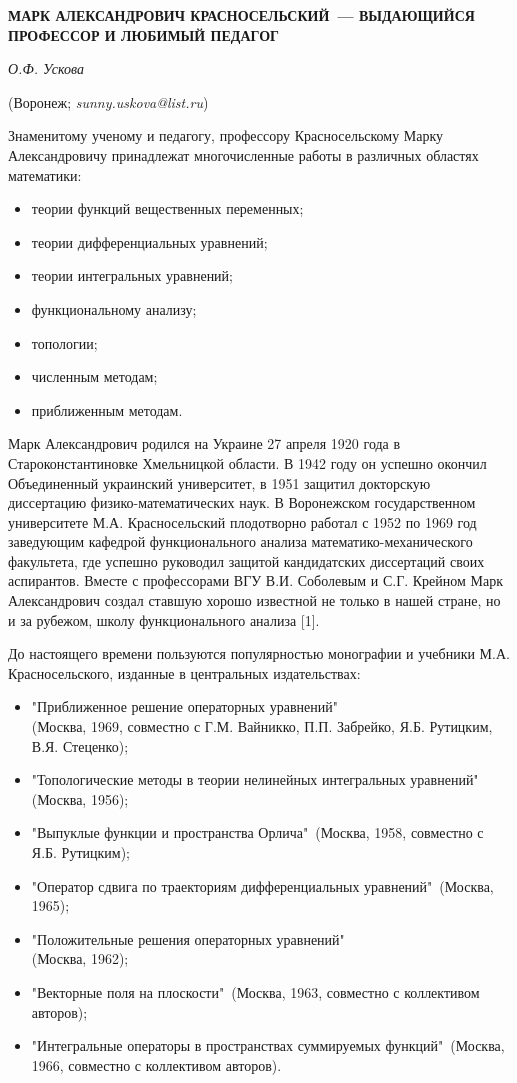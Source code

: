 \begin{center}
    {\bf МАРК АЛЕКСАНДРОВИЧ КРАСНОСЕЛЬСКИЙ~--- ВЫДАЮЩИЙСЯ ПРОФЕССОР И ЛЮБИМЫЙ ПЕДАГОГ}

    {\it О.Ф. Ускова}

    (Воронеж; {\it sunny.uskova@list.ru})
\end{center}


Знаменитому ученому и педагогу, профессору Красносельскому Марку Александровичу принадлежат многочисленные работы в различных
областях математики:
\begin{itemize}
\item теории функций вещественных переменных;
\item теории дифференциальных уравнений;
\item теории интегральных уравнений;
\item функциональному анализу;
\item топологии;
\item численным методам;
\item приближенным методам.
\end{itemize}

Марк Александрович родился на Украине 27 апреля 1920 года в Староконстантиновке Хмельницкой области. В 1942 году он успешно окончил
Объединенный украинский университет, в 1951 защитил докторскую диссертацию физико-математических наук. В Воронежском государственном
университете М.А. Красносельский плодотворно работал с 1952 по 1969 год заведующим кафедрой функционального анализа
математико-механического факультета, где успешно руководил защитой кандидатских диссертаций своих аспирантов. Вместе с профессорами
ВГУ В.И. Соболевым и С.Г. Крейном Марк Александрович создал ставшую хорошо известной не только в нашей стране, но и за рубежом,
школу функционального анализа [1].

До настоящего времени пользуются популярностью монографии и учебники М.А. Красносельского, изданные в центральных издательствах:
\begin{itemize}
\item "Приближенное решение операторных уравнений"\\ (Москва, 1969, совместно с Г.М. Вайникко, П.П. Забрейко, Я.Б. Рутицким,
В.Я. Стеценко);
\item "Топологические методы в теории нелинейных интегральных уравнений"\, (Москва, 1956);
\item "Выпуклые функции и пространства Орлича"\, (Москва, 1958, совместно с Я.Б. Рутицким);
\item "Оператор сдвига по траекториям дифференциальных уравнений"\, (Москва, 1965);
\item "Положительные решения операторных уравнений"\\(Москва, 1962);
\item "Векторные поля на плоскости"\, (Москва, 1963, совместно с коллективом авторов);
\item "Интегральные операторы в пространствах суммируемых функций"\, (Москва, 1966, совместно с коллективом авторов).
\end{itemize}

